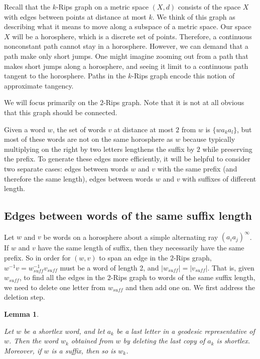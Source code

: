\documentclass[10pt,a4paper]{amsart}
\newtheorem{lemma}[theorem]{Lemma}
\theoremstyle{definition}
\theoremstyle{remark}
\begin{document}
	Recall that the $k$-Rips graph on a metric space $(X,d)$ consists of the space $X$ with edges between points at distance at most $k$. We think of this graph as describing what it means to move along a subspace of a metric space. Our space $X$ will be a horosphere, which is a discrete set of points. Therefore, a continuous nonconstant path cannot stay in a horosphere. However, we can demand that a path make only short jumps. One might imagine zooming out from a path that makes short jumps along a horosphere, and seeing it limit to a continuous path tangent to the horosphere. Paths in the $k$-Rips graph encode this notion of approximate tangency.
	
	We will focus primarily on the $2$-Rips graph. Note that it is not at all obvious that this graph should be connected.
	
	Given a word $w$, the set of words $v$ at distance at most $2$ from $w$ is $\{wa_ka_l\}$, but most of these words are not on the same horosphere as $w$ because typically multiplying on the right by two letters lengthens the suffix by $2$ while preserving the prefix. To generate these edges more efficiently, it will be helpful to consider two separate cases: edges between words $w$ and $v$ with the same prefix (and therefore the same length), edges between words $w$ and $v$ with suffixes of different length.  
	
	\subsection{Edges between words of the same suffix length} 
	\label{subsec:RipsEdgesSameLength}
        
	Let $w$ and $v$ be words on a horosphere about a simple alternating ray $(a_ia_j)^\infty$. If $w$ and $v$ have the same length of suffix, then they necessarily have the same prefix. So in order for $(w,v)$ to span an edge in the $2$-Rips graph, $w^{-1}v=w_{suff}^{-1}v_{suff}$ must be a word of length 2, and $|w_{suff}|=|v_{suff}|$. That is, given $w_{suff}$, to find all the edges in the $2$-Rips graph to words of the same suffix length, we need to delete one letter from $w_{suff}$ and then add one on. We first address the deletion step.
	
	\begin{lemma} \label{DeletionPreservesShortlexSuffixes}
		
		Let $w$ be a shortlex word, and let $a_k$ be a last letter in a geodesic representative of $w$. Then the word $w_k$ obtained from $w$ by deleting the last copy of $a_k$ is shortlex. Moreover, if $w$ is a suffix, then so is $w_k$.
		
	\end{lemma}
	
\end{document}
